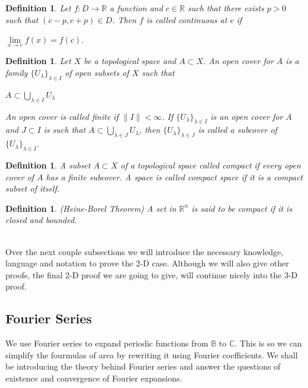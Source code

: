 \documentclass[a4paper]{book}
\newtheorem{definition}[theorem]{Definition}%
\numberwithin{theorem}{section}%
\begin{document}
\begin{definition}
	Let $f:D\to\mathbb{R}$ a function and $c\in\mathbb{R}$ such that there exists $p>0$ such that $(c-p,c+p)\in D$. Then $f$ is called \textit{continuous} at $c$ if
	\begin{center}
		$\underset{x\to c}{\lim}f(x)=f(c)$.
	\end{center}
\end{definition}

\begin{definition}
    Let $X$ be a topological space and $A \subset X$. An open cover for $A$ is a family $\{U_\lambda\}_{\lambda\in I}$ of open subsets of $X$ such that
    \begin{center}
        $A \subset\underset{\lambda\in I}{\bigcup}{U_\lambda}$
    \end{center}
    An open cover is called finite if $\|I\|<\infty$. If $\{U_\lambda\}_{\lambda\in I}$ is an open cover for $A$ and $J \subset I$ is such that $A\subset\underset{\lambda\in J}{\bigcup}{U_\lambda}$, then $\{U_\lambda\}_{\lambda\in J}$ is called a subcover of $\{U_\lambda\}_{\lambda\in I}$.
\end{definition}

\begin{definition}
    A subset $A \subset X$ of a topological space called compact if every open cover of $A$ has a finite subcover. A space is called compact space if it is a compact subset of itself.
\end{definition}

\begin{definition} (Heine-Borel Theorem)
    A set in $\mathbb{R}^n$ is said to be compact if it is closed and bounded.
\end{definition}\leavevmode \\

Over the next couple subsections we will introduce the necessary knowledge, language and notation to prove the 2-D case. Although we will also give other proofs, the final 2-D proof we are going to give, will continue nicely into the 3-D proof.

\newpage
\subsection{Fourier Series}
We use Fourier series to expand periodic functions from $\mathbb{B}$ to $\mathbb{C}$. This is so we can simplify the fourmulas of area by rewriting it using Fourier coefficients. We shall be introducing the theory behind Fourier series and answer the questions of existence and convergence of Fourier expansions.
\end{document}
